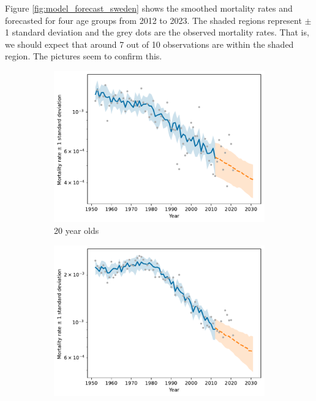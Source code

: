 \documentclass[preprint,12pt]{elsarticle}
\begin{document}
Figure \ref{fig:model_forecast_sweden} shows the smoothed mortality rates and forecasted for four age groups from 2012 to 2023. The shaded regions represent $\pm$ 1 standard deviation and the grey dots are the observed mortality rates. That is, we should expect that around 7 out of 10 observations are within the shaded region. The pictures seem to confirm this.  
\begin{figure}
    \centering
    \begin{subfigure}[b]{0.45\textwidth}
        \centering
        \includegraphics[width=\textwidth]{figs/sweden_1952_2011_Male_100_1_3rateVsTimeAge20.pdf}
        \caption{20 year olds}
    \end{subfigure}
    \hfill
    \begin{subfigure}[b]{0.45\textwidth}
        \centering
        \includegraphics[width=\textwidth]{figs/sweden_1952_2011_Male_100_1_3rateVsTimeAge40.pdf}

\end{subfigure}
\end{figure}
\end{document}
